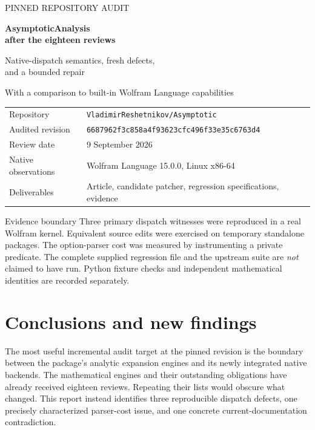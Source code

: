 \documentclass[11pt,letterpaper]{article}
\newcommand{\pin}{\texttt{6687962f3c858a4f93623cfc496f33e35c6763d4}}
\begin{document}
\begin{titlepage}
\vspace*{0.6in}
{\color{accent}\large PINNED REPOSITORY AUDIT}\par\vspace{0.3in}
{\Huge\bfseries AsymptoticAnalysis\\[8pt] after the eighteen reviews}\par
\vspace{0.3in}
{\Large Native-dispatch semantics, fresh defects,\\and a bounded repair}\par
\vspace{0.3in}
{\large With a comparison to built-in Wolfram Language capabilities}\par
\vfill
\begin{tabular}{@{}ll@{}}
Repository & \texttt{VladimirReshetnikov/Asymptotic}\\[5pt]
Audited revision & \pin\\[5pt]
Review date & 9 September 2026\\[5pt]
Native observations & Wolfram Language 15.0.0, Linux x86-64\\[5pt]
Deliverables & Article, candidate patcher, regression specifications, evidence
\end{tabular}
\vspace{0.35in}
\begin{findingbox}{Evidence boundary}
Three primary dispatch witnesses were reproduced in a real Wolfram kernel.
Equivalent source edits were exercised on temporary standalone packages.
The option-parser cost was measured by instrumenting a private predicate.
The complete supplied regression file and the upstream suite are \emph{not}
claimed to have run. Python fixture checks and independent mathematical
identities are recorded separately.
\end{findingbox}
\end{titlepage}
\begingroup
\fontsize{9.8}{11}\selectfont
\setlength{\parskip}{0pt}
\tableofcontents
\endgroup
\newpage

\section{Conclusions and new findings}

The most useful incremental audit target at the pinned revision is the boundary
between the package's analytic expansion engines and its newly integrated
native backends. The mathematical engines and their outstanding obligations
have already received eighteen reviews. Repeating their lists would obscure
what changed. This report instead identifies three reproducible dispatch
defects, one precisely characterized parser-cost issue, and one concrete
current-documentation contradiction.
\end{document}

